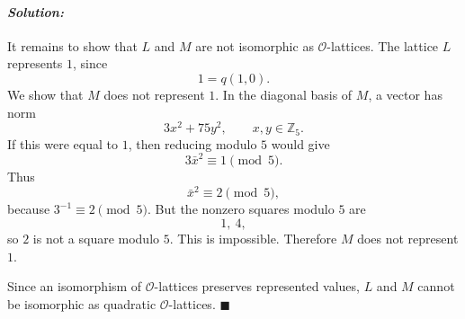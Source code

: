 \documentclass[12pt, a4paper]{article}
\newenvironment{solution}
  {\paragraph{\textit{Solution:}}\par\medskip}
  {\hfill$\blacksquare$\vspace{0.1cm}}
\begin{document}
\begin{solution}
It remains to show that \(L\) and \(M\) are not isomorphic as
\(\mathcal O\)-lattices. The lattice \(L\) represents \(1\), since
\[
1=q(1,0).
\]
We show that \(M\) does not represent \(1\). In the diagonal basis of \(M\),
a vector has norm
\[
3x^2+75y^2,\qquad x,y\in\mathbb Z_5.
\]
If this were equal to \(1\), then reducing modulo \(5\) would give
\[
3\bar x^2\equiv 1\pmod 5.
\]
Thus
\[
\bar x^2\equiv 2\pmod 5,
\]
because \(3^{-1}\equiv 2\pmod 5\). But the nonzero squares modulo \(5\) are
\[
1,\ 4,
\]
so \(2\) is not a square modulo \(5\). This is impossible. Therefore \(M\)
does not represent \(1\).

Since an isomorphism of \(\mathcal O\)-lattices preserves represented values,
\(L\) and \(M\) cannot be isomorphic as quadratic \(\mathcal O\)-lattices.
\end{solution}
\end{document}
